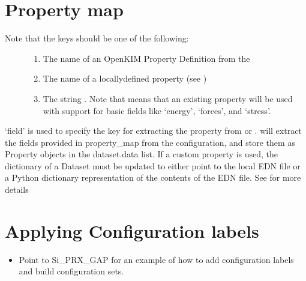 \documentclass[letterpaper,10pt,english]{sphinxmanual}
\begin{document}
\section{Property map}
\label{\detokenize{usage:property-map}}\begin{description}
\item[{Note that the keys should be one of the following:}] \leavevmode\begin{enumerate}
%
\item {} 
\sphinxAtStartPar
The name of an OpenKIM Property Definition from the 

\item {} 
\sphinxAtStartPar
The name of a locally\sphinxhyphen{}defined property (see {\hyperref[\detokenize{usage:custom-properties}]{}})

\item {} 
\sphinxAtStartPar
The string . Note that  means that an
existing property will be used with support for basic fields like
‘energy’, ‘forces’, and ‘stress’.

\end{enumerate}

\end{description}

\sphinxAtStartPar
‘field’ is used to specify the key for extracting the property from  or .
{\hyperref[\detokenize{dataset:colabfit.tools.dataset.Dataset.parse_data}]{}} will extract the fields
provided in property\_map from the configuration, and store them as Property
objects in the dataset.data list. If a custom property is used, the
 dictionary of a
Dataset must be updated to either point to the local EDN file or a Python
dictionary representation of the contents of the EDN file. See
{\hyperref[\detokenize{usage:custom-properties}]{}} for more details


\section{Applying Configuration labels}
\label{\detokenize{usage:applying-configuration-labels}}\begin{itemize}
\item {} 
\sphinxAtStartPar
Point to Si\_PRX\_GAP for an example of how to add configuration labels and
build configuration sets.

\end{itemize}
\end{document}
